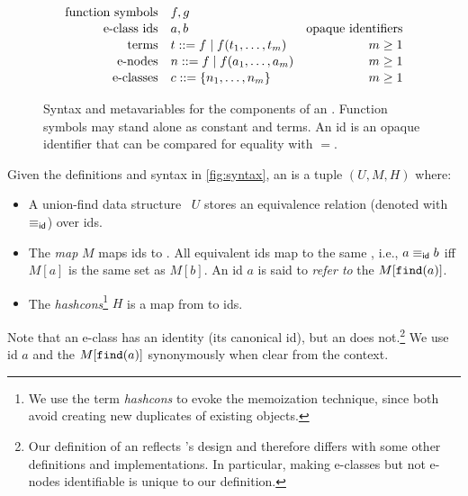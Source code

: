 \begin{figure}
  \centering
  \begin{align*}
     \text{function symbols} \quad & f,g                                   \\[-0.2em]
     \text{\eclass ids} \quad & a,b & \text{opaque identifiers}            \\[-0.2em]
     \text{terms}     \quad & t  ::= f \mid f(t_1, \ldots, t_m) & m \geq 1 \\[-0.2em]
     \text{\enodes}   \quad & n  ::= f \mid f(a_1, \ldots, a_m) & m \geq 1 \\[-0.2em]
     \text{\eclasses} \quad & c  ::= \{ n_1, \ldots, n_m \}     & m \geq 1
  \end{align*}
  \caption{
    Syntax and metavariables for the components of an \egraph.
    Function symbols may stand alone as constant \enodes and terms.
    An \eclass id is an opaque identifier that can be compared for equality with $=$.
  }
  \label{fig:syntax}
\end{figure}

\begin{definition}
  \label{def:egraph}

  Given the definitions and syntax in \autoref{fig:syntax},
  an \textit{\egraph} is a tuple $(U, M, H)$ where:
  \begin{itemize}
    \item
    A union-find data structure~\cite{unionfind} $U$
      stores an equivalence relation (denoted with $\equiv_{\sf id}$)
      over \eclass ids.

    \item
    The \textit{\eclass map} $M$ maps \eclass ids to \eclasses.
    All equivalent \eclass ids map to the same \eclass, i.e.,
      $a \equiv_{\sf id} b$ iff $M[a]$ is the same set as $M[b]$.
    An \eclass id $a$ is said to \textit{refer to} the \eclass $M[\texttt{find}(a)]$.

    \item The \textit{hashcons}\footnote{
      We use the term \textit{hashcons} to evoke the memoization technique,
      since both avoid creating new duplicates of existing objects.
    }
    $H$ is a map from \enodes to \eclass ids.
  \end{itemize}


  Note that an e-class has an identity
   (its canonical \eclass id),
   but an \enode does not.\footnote{
    Our definition of an \egraph reflects \egg's design
      and therefore differs with some other \egraph definitions and implementations.
    In particular, making e-classes but not e-nodes identifiable is unique to
      our definition.
  }
  We use \eclass id $a$ and the \eclass $M[\texttt{find}(a)]$ synonymously when clear from the context.

\end{definition}

